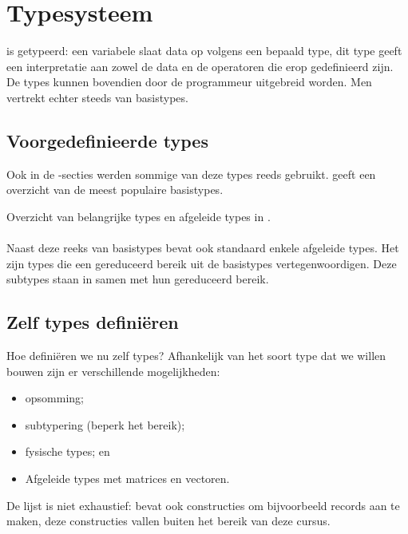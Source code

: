 \section{Typesysteem}
\tvhdl{} is getypeerd: een variabele slaat data op volgens een bepaald type, dit type geeft een interpretatie aan zowel de data en de operatoren die erop gedefinieerd zijn. De types kunnen bovendien door de programmeur uitgebreid worden. Men vertrekt echter steeds van basistypes.

\subsection{Voorgedefinieerde types}
Ook in de \tvhdl{}-secties werden sommige van deze types reeds gebruikt.  geeft een overzicht van de meest populaire basistypes.
\begin{table}[hbt]
\centering
{}
\caption{Overzicht van belangrijke types en afgeleide types in \tvhdl{}.}
\end{table}

\paragraph{}
Naast deze reeks van basistypes bevat \tvhdl{} ook standaard enkele afgeleide types. Het zijn types die een gereduceerd bereik uit de basistypes vertegenwoordigen. Deze subtypes staan in  samen met hun gereduceerd bereik.

\subsection{Zelf types defini\"eren}
Hoe defini\"eren we nu zelf types? Afhankelijk van het soort type dat we willen bouwen zijn er verschillende mogelijkheden:
\begin{itemize}
 \item opsomming;
 \item subtypering (beperk het bereik);
 \item fysische types; en
 \item Afgeleide types met matrices en vectoren.
\end{itemize}

De lijst is niet exhaustief: \tvhdl{} bevat ook constructies om bijvoorbeeld records aan te maken, deze constructies vallen buiten het bereik van deze cursus.

